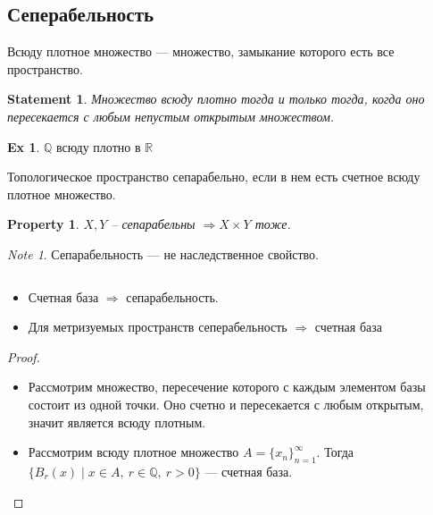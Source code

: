 \documentclass[11pt]{book}
\newcommand{\R}{\mathbb{R}}
\newcommand{\Q}{\mathbb{Q}}
\theoremstyle{definition}
\theoremstyle{plain}
\theoremstyle{plain}
\newtheorem*{st}{Statement}
\newtheorem*{prop}{Property}
\theoremstyle{definition}
\newtheorem*{ex}{Ex}
\theoremstyle{remark}
\newtheorem*{note}{Note}
\begin{document}
\subsection{Сеперабельность}
\begin{defn}
    {\sf Всюду плотное множество} --- множество, замыкание которого есть все пространство.
\end{defn}
\begin{st}
    Множество всюду плотно тогда и только тогда, когда оно пересекается с любым непустым открытым множеством.
\end{st}
\begin{ex}
    $ \Q$ всюду плотно в $ \R$
\end{ex}
\begin{defn}
    Топологическое пространство {\sf сепарабельно}, если в нем есть счетное всюду плотное множество.
\end{defn}
\begin{prop}
    $ X, Y$ -- сепарабельны $ \Longrightarrow  X \times Y$  тоже.
\end{prop}
\begin{note}
    Сепарабельность --- не наследственное свойство.
\end{note}
\begin{thm}$ $
    \begin{itemize}[noitemsep]
	\item Счетная база $ \Longrightarrow  $ сепарабельность.
	\item Для метризуемых пространств сеперабельность $\Longrightarrow$ счетная база
    \end{itemize}
\end{thm}
\begin{proof}
    $ $
    \begin{itemize}
	\item   Рассмотрим множество, пересечение которого с каждым элементом базы состоит из одной точки. Оно счетно и пересекается с любым открытым, значит является всюду плотным.
\item Рассмотрим всюду плотное множество $ A = \{x_{n}\}_{n =1}^{\infty}$. Тогда  $ \{B_{r}(x)\mid x \in A, ~ r \in \Q, ~ r>0\}$ --- счетная база.
	\end{itemize}
\end{proof}
\end{document}
